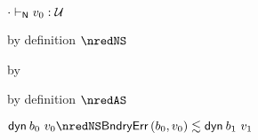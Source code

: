 {\begin{lamportproof*}
    \begin{pfproof}
      \absurdstep
        \begin{pfproof}
          $\snil \sWTN \svalue_0 : \tdyn$
        \end{pfproof}
    \end{pfproof}

    \begin{pfproof}
        \begin{pfproof}
            \begin{pfproof}
              by definition $\nredNS$
            \end{pfproof}
            \begin{pfproof}
              by 
            \end{pfproof}
            \begin{pfproof}
              by definition $\nredAS$
            \end{pfproof}
          \qedstep
            \begin{pfproof}
              \begin{mathpar}
              \end{mathpar}
            \end{pfproof}
        \end{pfproof}
        \begin{pfproof}
          \qedstep
            \begin{pfproof}
              $\edynb{\sbnd_0}{\svalue_0} \nredNS \rexpr{\boundaryerror{\sbnd_0}{\svalue_0}}{\edynb{\sbnd_1}{\svalue_1}}$
            \end{pfproof}
        \end{pfproof}
    \end{pfproof}


\end{lamportproof*}}

